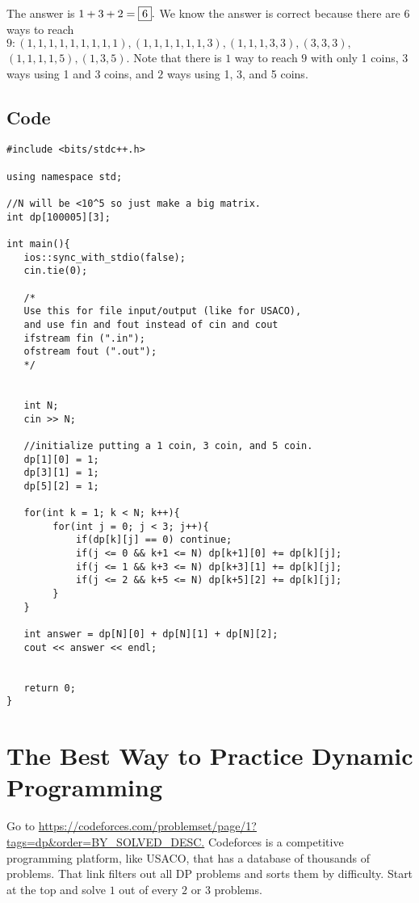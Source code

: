 \documentclass{article}
\begin{document}
The answer is $1+3+2=\fbox{6}.$ We know the answer is correct because there are $6$ ways to reach $9: (1,1,1,1,1,1,1,1,1), (1,1,1,1,1,1,3), (1,1,1,3,3), (3,3,3),$ $(1,1,1,1,5), (1,3,5).$ Note that there is $1$ way to reach $9$ with only 1 coins, $3$ ways using 1 and 3 coins, and $2$ ways using 1, 3, and 5 coins.

\subsection{Code}
\begin{lstlisting}
#include <bits/stdc++.h>

using namespace std;

//N will be <10^5 so just make a big matrix.
int dp[100005][3];

int main(){
   ios::sync_with_stdio(false);
   cin.tie(0);
   
   /*
   Use this for file input/output (like for USACO),
   and use fin and fout instead of cin and cout
   ifstream fin (".in");
   ofstream fout (".out");
   */
   
   
   int N;
   cin >> N;
   
   //initialize putting a 1 coin, 3 coin, and 5 coin.
   dp[1][0] = 1;
   dp[3][1] = 1;
   dp[5][2] = 1;
   
   for(int k = 1; k < N; k++){
        for(int j = 0; j < 3; j++){
            if(dp[k][j] == 0) continue;
            if(j <= 0 && k+1 <= N) dp[k+1][0] += dp[k][j];
            if(j <= 1 && k+3 <= N) dp[k+3][1] += dp[k][j];
            if(j <= 2 && k+5 <= N) dp[k+5][2] += dp[k][j];
        }
   }
   
   int answer = dp[N][0] + dp[N][1] + dp[N][2];
   cout << answer << endl;
   
   
   return 0;
}
\end{lstlisting}



\section{The Best Way to Practice Dynamic Programming}
Go to \url{https://codeforces.com/problemset/page/1?tags=dp&order=BY_SOLVED_DESC.} Codeforces is a competitive programming platform, like USACO, that has a database of thousands of problems. That link filters out all DP problems and sorts them by difficulty. Start at the top and solve $1$ out of every $2$ or $3$ problems.
\end{document}
